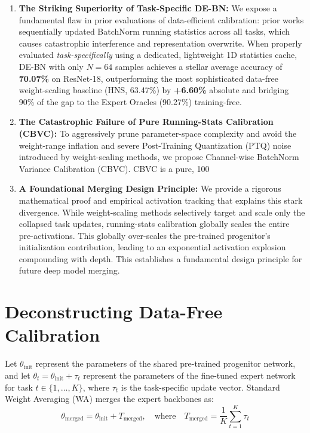 \documentclass{article}
\begin{document}
\begin{enumerate}
    \item \textbf{The Striking Superiority of Task-Specific DE-BN:} We expose a fundamental flaw in prior evaluations of data-efficient calibration: prior works sequentially updated BatchNorm running statistics across all tasks, which causes catastrophic interference and representation overwrite. When properly evaluated \textit{task-specifically} using a dedicated, lightweight 1D statistics cache, DE-BN with only $N=64$ samples achieves a stellar average accuracy of \textbf{70.07\%} on ResNet-18, outperforming the most sophisticated data-free weight-scaling baseline (HNS, 63.47\%) by \textbf{+6.60\%} absolute and bridging 90\% of the gap to the Expert Oracles (90.27\%) training-free.
    \item \textbf{The Catastrophic Failure of Pure Running-Stats Calibration (CBVC):} To aggressively prune parameter-space complexity and avoid the weight-range inflation and severe Post-Training Quantization (PTQ) noise introduced by weight-scaling methods, we propose Channel-wise BatchNorm Variance Calibration (CBVC). CBVC is a pure, 100%
    \item \textbf{A Foundational Merging Design Principle:} We provide a rigorous mathematical proof and empirical activation tracking that explains this stark divergence. While weight-scaling methods selectively target and scale only the collapsed task updates, running-stats calibration globally scales the entire pre-activations. This globally over-scales the pre-trained progenitor's initialization contribution, leading to an exponential activation explosion compounding with depth. This establishes a fundamental design principle for future deep model merging.
\end{enumerate}

\section{Deconstructing Data-Free Calibration}
\label{sec:deconstruct}
Let $\theta_{\text{init}}$ represent the parameters of the shared pre-trained progenitor network, and let $\theta_t = \theta_{\text{init}} + \tau_t$ represent the parameters of the fine-tuned expert network for task $t \in \{1,\dots,K\}$, where $\tau_t$ is the task-specific update vector. Standard Weight Averaging (WA) merges the expert backbones as:
\begin{equation}
    \theta_{\text{merged}} = \theta_{\text{init}} + T_{\text{merged}}, \quad \text{where} \quad T_{\text{merged}} = \frac{1}{K} \sum_{t=1}^K \tau_t
\end{equation}
\end{document}

